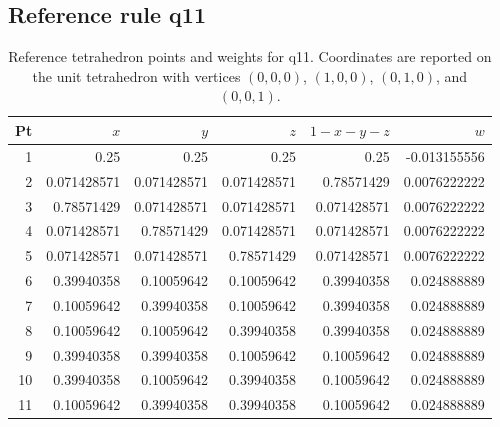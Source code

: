 \subsection*{Reference rule q11}
\scriptsize
\begin{table}[H]
\centering
\caption{Reference tetrahedron points and weights for q11. Coordinates are reported on the unit tetrahedron with vertices $(0,0,0)$, $(1,0,0)$, $(0,1,0)$, and $(0,0,1)$.}
\begin{tabular}{@{}rrrrrr@{}}
\toprule
Pt & $x$ & $y$ & $z$ & $1-x-y-z$ & $w$ \\
\midrule
1 & 0.25 & 0.25 & 0.25 & 0.25 & -0.013155556 \\
2 & 0.071428571 & 0.071428571 & 0.071428571 & 0.78571429 & 0.0076222222 \\
3 & 0.78571429 & 0.071428571 & 0.071428571 & 0.071428571 & 0.0076222222 \\
4 & 0.071428571 & 0.78571429 & 0.071428571 & 0.071428571 & 0.0076222222 \\
5 & 0.071428571 & 0.071428571 & 0.78571429 & 0.071428571 & 0.0076222222 \\
6 & 0.39940358 & 0.10059642 & 0.10059642 & 0.39940358 & 0.024888889 \\
7 & 0.10059642 & 0.39940358 & 0.10059642 & 0.39940358 & 0.024888889 \\
8 & 0.10059642 & 0.10059642 & 0.39940358 & 0.39940358 & 0.024888889 \\
9 & 0.39940358 & 0.39940358 & 0.10059642 & 0.10059642 & 0.024888889 \\
10 & 0.39940358 & 0.10059642 & 0.39940358 & 0.10059642 & 0.024888889 \\
11 & 0.10059642 & 0.39940358 & 0.39940358 & 0.10059642 & 0.024888889 \\
\bottomrule
\end{tabular}
\end{table}
\normalsize

